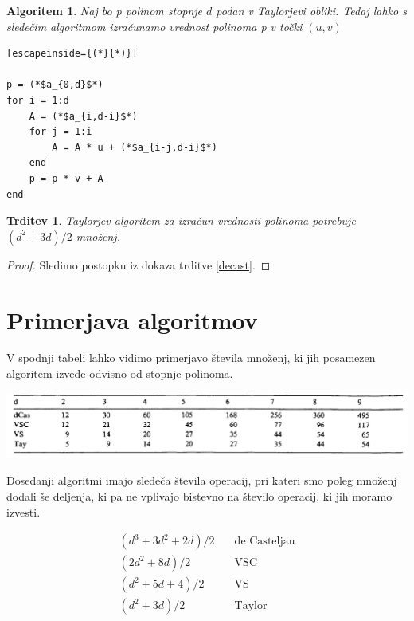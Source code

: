\documentclass{article}
\newtheorem{algoritm}{Algoritem}[section]
\newtheorem{trditev}{Trditev}[section]
\begin{document}
\begin{algoritm}
Naj bo p polinom stopnje $d$ podan v Taylorjevi obliki. Tedaj lahko s sledečim algoritmom izračunamo vrednost polinoma p v točki $(u,v)$
\begin{lstlisting}[escapeinside={(*}{*)}]

p = (*$a_{0,d}$*)
for i = 1:d
    A = (*$a_{i,d-i}$*)
    for j = 1:i
        A = A * u + (*$a_{i-j,d-i}$*)
    end
    p = p * v + A
end
\end{lstlisting}
\end{algoritm}

\begin{trditev}
Taylorjev algoritem za izračun vrednosti polinoma potrebuje $(d^2+3d)/2$ množenj.
\end{trditev}

\begin{proof}
Sledimo postopku iz dokaza trditve \ref{decast}.
\end{proof}

\section{Primerjava algoritmov}

V spodnji tabeli lahko vidimo primerjavo števila množenj, ki jih posamezen algoritem izvede odvisno od stopnje polinoma.

\begin{center}
\includegraphics[width=.9\linewidth]{tabelca.PNG}
\end{center}

 Dosedanji algoritmi imajo sledeča števila operacij, pri kateri smo poleg množenj dodali še deljenja, ki pa ne vplivajo bistevno na število operacij, ki jih moramo izvesti.

\begin{align}
(d^3+3d^2+2d)/2& \quad \text{de Casteljau} \nonumber \\
(2d^2+8d)/2& \quad \text{VSC} \nonumber \\
(d^2+5d+4)/2& \quad \text{VS} \nonumber \\
(d^2+3d)/2& \quad \text{Taylor} \nonumber
\end{align}
\end{document}
